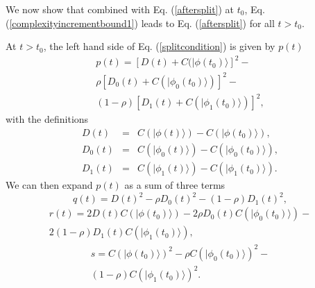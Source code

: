 \documentclass[twocolumn,amsmath,amssymb]{revtex4-1}
\begin{document}
We now show that combined with Eq. (\ref{aftersplit}) at
$t_0$, Eq. (\ref{complexityincrementbound1}) leads
to Eq. (\ref{aftersplit}) for all $t > t_0$.

At  $t > t_0$, the left hand side of Eq. (\ref{splitcondition}) is given
by $p(t)$
\begin{multline}
  \label{lefthand}
  p(t) = [ D( t) + C(|\phi( t_0) \rangle ] ^2 - \\
  \rho [D_0( t) + C( |\phi_0(t_0) \rangle )]^2 - \\
  (1-\rho) [D_1( t) + C( |\phi_1(t_0) \rangle )]^2,
\end{multline}
with the definitions
\begin{subequations}
  \begin{eqnarray}
    \label{defD}
    D(t) & = &  C( |\phi(t) \rangle ) - C(|\phi(t_0) \rangle ) ,\\
 \label{defD0}
    D_0(t) & = &  C( |\phi_0(t) \rangle ) - C(|\phi_0(t_0) \rangle ) ,\\
 \label{defD1}
    D_1(t) & = &  C( |\phi_1(t) \rangle ) - C(|\phi_1(t_0) \rangle ).
  \end{eqnarray}
\end{subequations}
We can then expand $p(t)$ as a sum of three terms
\begin{equation}
  \label{alpha}
  q( t) = D(t)^2 - \rho D_0(t)^2 - (1 - \rho) D_1(t)^2,
\end{equation}
\begin{multline}
  \label{beta}
  r( t) = 2 D(t)C(|\phi(t_0) \rangle ) - 2\rho D_0(t)C(|\phi_0(t_0) \rangle ) - \\2 (1 - \rho) D_1(t)C(|\phi_1(t_0) \rangle ),
\end{multline}
\begin{multline}
  \label{gamma}
  s = C(|\phi(t_0) \rangle )^2 - \rho C(|\phi_0(t_0) \rangle )^2 - \\(1 - \rho)C(|\phi_1(t_0) \rangle )^2.
\end{multline}
\end{document}
